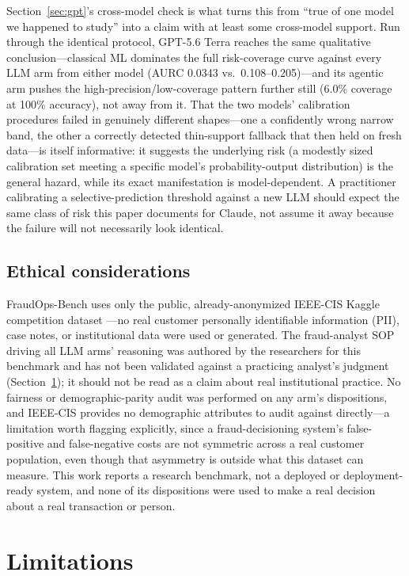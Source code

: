 \documentclass[]{ieeeaccess}
\begin{document}
Section~\ref{sec:gpt}'s cross-model check is what turns this from ``true of one
model we happened to study'' into a claim with at least some
cross-model support. Run through the identical protocol, GPT-5.6 Terra
reaches the same qualitative conclusion---classical ML dominates the
full risk-coverage curve against every LLM arm from either model (AURC
0.0343 vs.\ 0.108--0.205)---and its agentic arm pushes the
high-precision/low-coverage pattern further still (6.0\% coverage at
100\% accuracy), not away from it. That the two models' calibration
procedures failed in genuinely different shapes---one a confidently
wrong narrow band, the other a correctly detected thin-support fallback
that then held on fresh data---is itself informative: it suggests the
underlying risk (a modestly sized calibration set meeting a specific
model's probability-output distribution) is the general hazard, while
its exact manifestation is model-dependent. A practitioner calibrating a
selective-prediction threshold against a new LLM should expect the same
class of risk this paper documents for Claude, not assume it away
because the failure will not necessarily look identical.

\subsection{Ethical considerations}\label{sec:ethics}

FraudOps-Bench uses only the public, already-anonymized IEEE-CIS Kaggle
competition dataset \cite{ieeecis2019}---no real customer personally
identifiable information (PII), case notes, or institutional data were
used or generated. The fraud-analyst SOP driving all LLM arms' reasoning
was authored by the researchers for this benchmark and has not been
validated against a practicing analyst's judgment (Section~\ref{sec:limits}); it should
not be read as a claim about real institutional practice. No fairness or
demographic-parity audit was performed on any arm's dispositions, and
IEEE-CIS provides no demographic attributes to audit against directly---a limitation worth flagging explicitly, since a fraud-decisioning
system's false-positive and false-negative costs are not symmetric
across a real customer population, even though that asymmetry is outside
what this dataset can measure. This work reports a research benchmark,
not a deployed or deployment-ready system, and none of its dispositions
were used to make a real decision about a real transaction or person.

\section{Limitations}\label{sec:limits}
\end{document}
